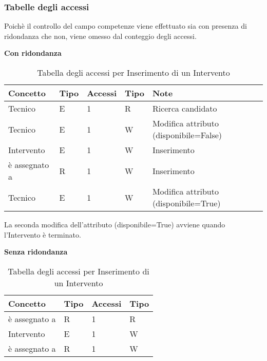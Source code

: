 \documentclass{article}
\begin{document}
\subsubsection{Tabelle degli accessi}
Poichè il controllo del campo competenze viene effettuato sia con presenza di ridondanza che non, viene omesso dal conteggio degli accessi. 

\textbf{Con ridondanza}

\begin{table}[h!]
    \centering
        \begin{adjustbox}{width=1\textwidth}
            \begin{tabular}{|m{}|m{2cm}|m{2cm}|m{2cm}|m{6cm}|}
                \hline  
                \textbf{Concetto} & \textbf{Tipo} & \textbf{Accessi} & \textbf{Tipo} & \textbf{Note}\\ 
                \hline
                Tecnico & E & 1 & R & Ricerca candidato \\
                \hline
                Tecnico & E & 1 & W & Modifica attributo (disponibile=False)\\
                \hline
                Intervento & E & 1 & W & Inserimento \\
                \hline
                è assegnato a & R & 1 & W & Inserimento \\
                \hline
                Tecnico & E & 1 & W & Modifica attributo (disponibile=True)\\
                \hline
            \end{tabular}
        \end{adjustbox}
    \caption{Tabella degli accessi per Inserimento di un Intervento}
    \label{tab:accesstable13}
\end{table}

La seconda modifica dell'attributo (disponibile=True) avviene quando l'Intervento è terminato.

\textbf{Senza ridondanza}

\begin{table}[h]
    \centering
        \begin{adjustbox}{width=0.6\textwidth}
            \begin{tabular}{|m{}|m{2cm}|m{2cm}|m{2cm}|}
                \hline  
                \textbf{Concetto} & \textbf{Tipo} & \textbf{Accessi} & \textbf{Tipo} \\ 
                \hline
                è assegnato a & R & 1 & R \\
                \hline
                Intervento & E & 1 & W \\
                \hline
                è assegnato a & R & 1 & W \\
                \hline
            \end{tabular}
        \end{adjustbox}
    \caption{Tabella degli accessi per Inserimento di un Intervento}
    \label{tab:accesstable14}
\end{table}
\end{document}
